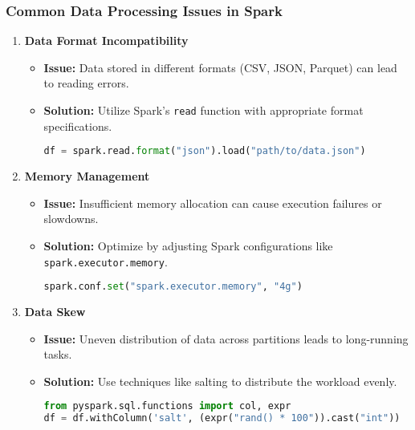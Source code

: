 \documentclass[aspectratio=169]{beamer}
\begin{document}
\begin{frame}[fragile]
    \frametitle{Common Data Processing Issues in Spark}
    \begin{enumerate}
        \item \textbf{Data Format Incompatibility}
            \begin{itemize}
                \item \textbf{Issue:} Data stored in different formats (CSV, JSON, Parquet) can lead to reading errors.
                \item \textbf{Solution:} Utilize Spark’s \texttt{read} function with appropriate format specifications.
                \begin{lstlisting}[language=Python]
df = spark.read.format("json").load("path/to/data.json")
                \end{lstlisting}
            \end{itemize}
        
        \item \textbf{Memory Management}
            \begin{itemize}
                \item \textbf{Issue:} Insufficient memory allocation can cause execution failures or slowdowns.
                \item \textbf{Solution:} Optimize by adjusting Spark configurations like \texttt{spark.executor.memory}.
                \begin{lstlisting}[language=Python]
spark.conf.set("spark.executor.memory", "4g")
                \end{lstlisting}
            \end{itemize}
        
        \item \textbf{Data Skew}
            \begin{itemize}
                \item \textbf{Issue:} Uneven distribution of data across partitions leads to long-running tasks.
                \item \textbf{Solution:} Use techniques like salting to distribute the workload evenly.
                \begin{lstlisting}[language=Python]
from pyspark.sql.functions import col, expr
df = df.withColumn('salt', (expr("rand() * 100")).cast("int"))
                \end{lstlisting}
            \end{itemize}
    \end{enumerate}
\end{frame}
\end{document}
